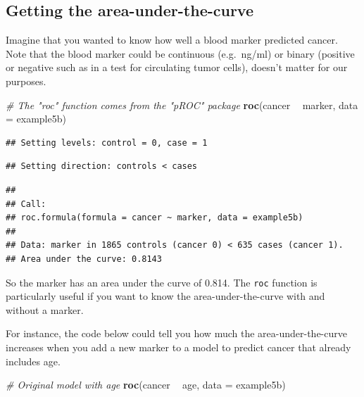 \documentclass[]{book}
\newenvironment{Shaded}{\begin{snugshade}}{\end{snugshade}}
\newcommand{\CommentTok}[1]{\textcolor[rgb]{0.56,0.35,0.01}{\textit{#1}}}
\newcommand{\DataTypeTok}[1]{\textcolor[rgb]{0.13,0.29,0.53}{#1}}
\newcommand{\KeywordTok}[1]{\textcolor[rgb]{0.13,0.29,0.53}{\textbf{#1}}}
\newcommand{\NormalTok}[1]{#1}
\newcommand{\OperatorTok}[1]{\textcolor[rgb]{0.81,0.36,0.00}{\textbf{#1}}}
\newcommand{\StringTok}[1]{\textcolor[rgb]{0.31,0.60,0.02}{#1}}
\begin{document}
\hypertarget{getting-the-area-under-the-curve}{%
\subsection{Getting the area-under-the-curve}\label{getting-the-area-under-the-curve}}

Imagine that you wanted to know how well a blood marker predicted cancer. Note that the blood marker could be continuous (e.g.~ng/ml) or binary (positive or negative such as in a test for circulating tumor cells), doesn't matter for our purposes.

\begin{Shaded}
\begin{Highlighting}[]
\CommentTok{# The "roc" function comes from the "pROC" package}
\KeywordTok{roc}\NormalTok{(cancer }\OperatorTok{~}\StringTok{ }\NormalTok{marker, }\DataTypeTok{data =}\NormalTok{ example5b)}
\end{Highlighting}
\end{Shaded}

\begin{verbatim}
## Setting levels: control = 0, case = 1
\end{verbatim}

\begin{verbatim}
## Setting direction: controls < cases
\end{verbatim}

\begin{verbatim}
## 
## Call:
## roc.formula(formula = cancer ~ marker, data = example5b)
## 
## Data: marker in 1865 controls (cancer 0) < 635 cases (cancer 1).
## Area under the curve: 0.8143
\end{verbatim}

So the marker has an area under the curve of 0.814. The \texttt{roc} function is particularly useful if you want to know the area-under-the-curve with and without a marker.

For instance, the code below could tell you how much the area-under-the-curve increases when you add a new marker to a model to predict cancer that already includes age.

\begin{Shaded}
\begin{Highlighting}[]
\CommentTok{# Original model with age}
\KeywordTok{roc}\NormalTok{(cancer }\OperatorTok{~}\StringTok{ }\NormalTok{age, }\DataTypeTok{data =}\NormalTok{ example5b)}
\end{Highlighting}
\end{Shaded}
\end{document}

